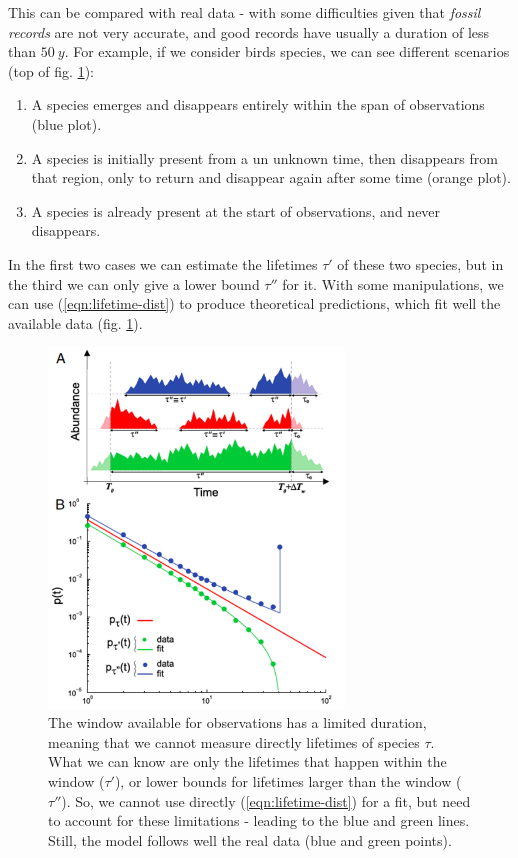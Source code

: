 \documentclass[../../main.tex]{subfiles}
\begin{document}
This can be compared with real data - with some difficulties given that \textit{fossil records} are not very accurate, and good records have usually a duration of less than $\SI{50}{y}$. For example, if we consider birds species, we can see different scenarios (top of fig. \ref{fig:birds}):
\begin{enumerate}
    \item A species emerges and disappears entirely within the span of observations (blue plot).
    \item A species is initially present from a un unknown time, then disappears from that region, only to return and disappear again after some time (orange plot).
    \item A species is already present at the start of observations, and never disappears.
\end{enumerate}
In the first two cases we can estimate the lifetimes $\tau'$ of these two species, but in the third we can only give a lower bound $\tau''$ for it. With some manipulations, we can use (\ref{eqn:lifetime-dist}) to produce theoretical predictions, which fit well the available data (fig. \ref{fig:birds}).

\begin{figure}[H]
    \centering
    \includegraphics[width=0.7\textwidth]{birds.png}
    \caption{The window available for observations has a limited duration, meaning that we cannot measure directly lifetimes of species $\tau$. What we can know are only the lifetimes that happen within the window ($\tau'$), or lower bounds for lifetimes larger than the window ($\tau''$). So, we cannot use directly (\ref{eqn:lifetime-dist}) for a fit, but need to account for these limitations - leading to the blue and green lines. Still, the model follows well the real data (blue and green points).}
    \label{fig:birds}
\end{figure}
\end{document}
